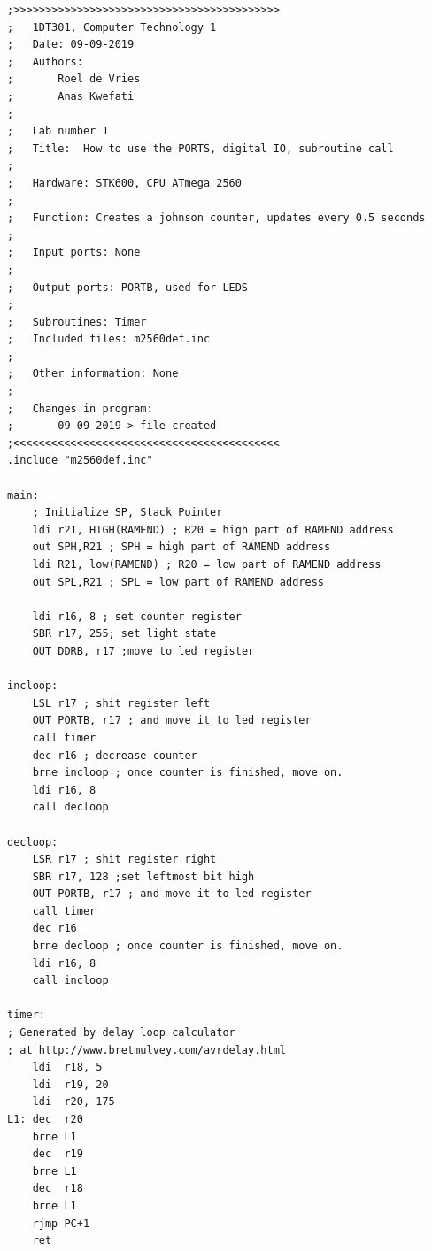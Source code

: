 \documentclass[a4paper,12pt]{article}
\begin{document}
\lstset{style=Asm}

\begin{lstlisting}
;>>>>>>>>>>>>>>>>>>>>>>>>>>>>>>>>>>>>>>>>>>
;	1DT301, Computer Technology 1
;	Date: 09-09-2019
;	Authors:
;		Roel de Vries
;		Anas Kwefati
;
;	Lab number 1
;	Title:	How to use the PORTS, digital IO, subroutine call
;
;	Hardware: STK600, CPU ATmega 2560
;
;	Function: Creates a johnson counter, updates every 0.5 seconds
;
;	Input ports: None
;
;	Output ports: PORTB, used for LEDS
;
;	Subroutines: Timer
;	Included files: m2560def.inc
;
;	Other information: None
;
;	Changes in program: 
;		09-09-2019 > file created
;<<<<<<<<<<<<<<<<<<<<<<<<<<<<<<<<<<<<<<<<<<
.include "m2560def.inc"

main:
	; Initialize SP, Stack Pointer
	ldi r21, HIGH(RAMEND) ; R20 = high part of RAMEND address
	out SPH,R21 ; SPH = high part of RAMEND address
	ldi R21, low(RAMEND) ; R20 = low part of RAMEND address
	out SPL,R21 ; SPL = low part of RAMEND address

	ldi r16, 8 ; set counter register
	SBR r17, 255; set light state 
	OUT DDRB, r17 ;move to led register

incloop:
	LSL r17 ; shit register left
	OUT PORTB, r17 ; and move it to led register
	call timer
	dec r16 ; decrease counter
    brne incloop ; once counter is finished, move on.
	ldi r16, 8
	call decloop

decloop:
	LSR r17 ; shit register right
	SBR r17, 128 ;set leftmost bit high
	OUT PORTB, r17 ; and move it to led register
	call timer
	dec r16
    brne decloop ; once counter is finished, move on.
	ldi r16, 8
	call incloop

timer:
; Generated by delay loop calculator
; at http://www.bretmulvey.com/avrdelay.html
	ldi  r18, 5
    ldi  r19, 20
    ldi  r20, 175
L1: dec  r20
    brne L1
    dec  r19
    brne L1
    dec  r18
    brne L1
    rjmp PC+1
	ret

\end{lstlisting}
\end{document}
